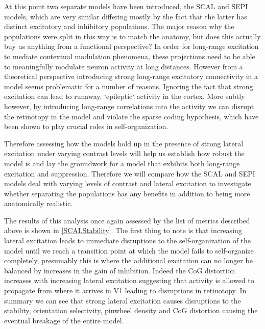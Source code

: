 At this point two separate models have been introduced, the SCAL and
SEPI models, which are very similar differing mostly by the fact that
the latter has distinct excitatory and inhibitory populations. The
major reason why the populations were split in this way is to match
the anatomy, but does this actually buy us anything from a functional
perspective? In order for long-range excitation to mediate contextual
modulation phenomena, these projections need to be able to
meaningfully modulate neuron activity at long distances. However from
a theoretical perspective introducing strong long-range excitatory
connectivity in a model seems problematic for a number of
reasons. Ignoring the fact that strong excitation can lead to runaway,
`epileptic` activity in the cortex. More subtly however, by
introducing long-range correlations into the activity we can disrupt
the retinotopy in the model and violate the sparse coding hypothesis,
which have been shown to play crucial roles in self-organization.

Therefore assessing how the models hold up in the presence of strong
lateral excitation under varying contrast levels will help us
establish how robust the model is and lay the groundwork for a model
that exhibits both long-range excitation and suppression. Therefore we
will compare how the SCAL and SEPI models deal with varying levels of
contrast and lateral excitation to investigate whether separating the
populations has any benefits in addition to being more anatomically
realistic.

The results of this analysis once again assessed by the list of
metrics described above is shown in \ref{SCALStability}. The first
thing to note is that increasing lateral excitation leads to immediate
disruptions to the self-organization of the model until we reach a
transition point at which the model fails to self-organize completely,
presumably this is where the additional excitation can no longer be
balanced by increases in the gain of inhibition. Indeed the CoG
distortion increases with increasing lateral excitation suggesting
that activity is allowed to propagate from where it arrives in V1
leading to disruptions in retinotopy. In summary we can see that
strong lateral excitation causes disruptions to the stability,
orientation selectivity, pinwheel density and CoG distortion causing
the eventual breakage of the entire model.

